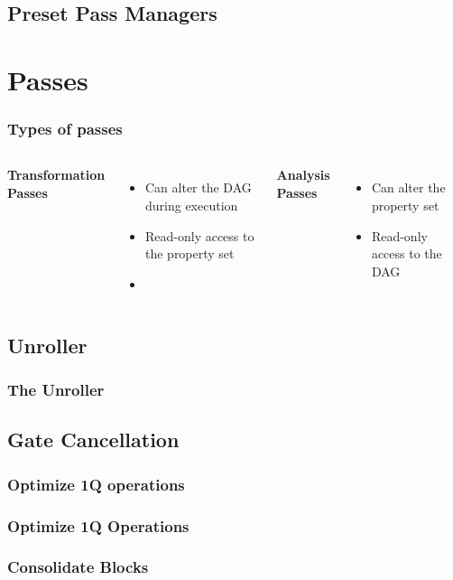 \documentclass[aspectratio=169,11pt,hyperref={colorlinks=true}]{beamer}
\begin{document}
\subsection{Preset Pass Managers}
\section{Passes}
\begin{frame}
    \frametitle{Types of passes}
    \begin{columns}
            \textbf{Transformation Passes} \\
            \begin{itemize}
                \item Can alter the DAG during execution
                \item Read-only access to the property set
                \item
            \end{itemize}
            \textbf{Analysis Passes} \\
            \begin{itemize}
                \item Can alter the property set
                \item Read-only access to the DAG
            \end{itemize}
    \end{columns}
\end{frame}
\subsection{Unroller}
\begin{frame}
    \frametitle{The Unroller}
\end{frame}
\subsection{Gate Cancellation}
\subsubsection{Optimize 1Q operations}
\begin{frame}
    \frametitle{Optimize 1Q Operations}
\end{frame}
\subsubsection{Consolidate Blocks}
\begin{frame}

\end{frame}
\end{document}
